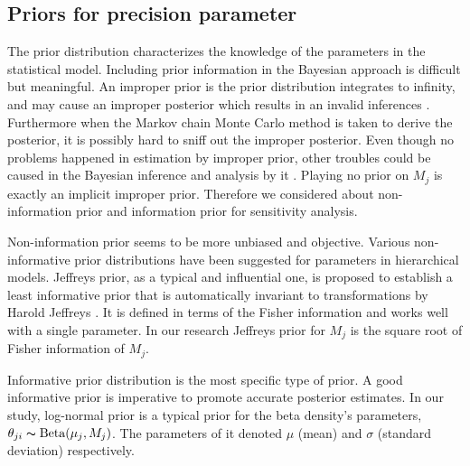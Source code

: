 \documentclass[11pt,reqno]{amsart}
\begin{document}
\subsection{Priors for precision parameter}
The prior distribution characterizes the knowledge of the parameters in the statistical model. Including prior information in the Bayesian approach is difficult but meaningful.
An improper prior is the prior distribution integrates to infinity, and may cause an improper posterior which results in an invalid inferences \citep{lesaffre2012bayesian}.
Furthermore when the Markov chain Monte Carlo method is taken to derive the posterior, it is possibly hard to sniff out the improper posterior.
Even though no problems happened in estimation by improper prior, other troubles could be caused in the Bayesian inference and analysis by it \citep{stein1965approximation}.
Playing no prior on $ M_{j}$ is exactly an implicit improper prior. Therefore we considered about non-information prior and information prior for sensitivity analysis.

Non-information prior seems to be more unbiased and objective.
Various non-informative prior distributions have been suggested for parameters in hierarchical models.
Jeffreys prior, as a typical and influential one, is proposed to establish a least informative prior that is automatically invariant to transformations by Harold Jeffreys \citep{jeffreys1946invariant}.
It is defined in terms of the Fisher information and works well with a single parameter. In our research Jeffreys prior for $M_j$ is the square root of Fisher information of $M_j$.

Informative prior distribution is the most specific type of prior. A good informative prior is imperative to promote accurate posterior estimates.
In our study, log-normal prior is a typical prior for the beta density's parameters, $\theta_{ji} \thicksim \text{Beta}(\mu_j, M_j)$.
The parameters of it denoted $\mu$ (mean) and $\sigma$ (standard deviation) respectively.

\end{document}
